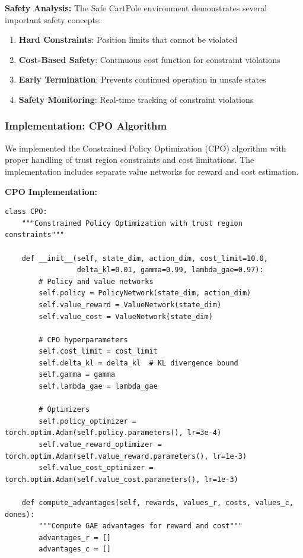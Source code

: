 \documentclass[12pt]{article}
\begin{document}
{{{{\textbf{Safety Analysis:}
The Safe CartPole environment demonstrates several important safety concepts:
\begin{enumerate}
\item \textbf{Hard Constraints}: Position limits that cannot be violated
\item \textbf{Cost-Based Safety}: Continuous cost function for constraint violations
\item \textbf{Early Termination}: Prevents continued operation in unsafe states
\item \textbf{Safety Monitoring}: Real-time tracking of constraint violations
\end{enumerate}

\subsubsection{Implementation: CPO Algorithm}

We implemented the Constrained Policy Optimization (CPO) algorithm with proper handling of trust region constraints and cost limitations. The implementation includes separate value networks for reward and cost estimation.

\textbf{CPO Implementation:}
\begin{verbatim}
class CPO:
    """Constrained Policy Optimization with trust region constraints"""
    
    def __init__(self, state_dim, action_dim, cost_limit=10.0, 
                 delta_kl=0.01, gamma=0.99, lambda_gae=0.97):
        # Policy and value networks
        self.policy = PolicyNetwork(state_dim, action_dim)
        self.value_reward = ValueNetwork(state_dim)
        self.value_cost = ValueNetwork(state_dim)
        
        # CPO hyperparameters
        self.cost_limit = cost_limit
        self.delta_kl = delta_kl  # KL divergence bound
        self.gamma = gamma
        self.lambda_gae = lambda_gae
        
        # Optimizers
        self.policy_optimizer = torch.optim.Adam(self.policy.parameters(), lr=3e-4)
        self.value_reward_optimizer = torch.optim.Adam(self.value_reward.parameters(), lr=1e-3)
        self.value_cost_optimizer = torch.optim.Adam(self.value_cost.parameters(), lr=1e-3)
    
    def compute_advantages(self, rewards, values_r, costs, values_c, dones):
        """Compute GAE advantages for reward and cost"""
        advantages_r = []
        advantages_c = []
        

\end{verbatim}}}}}
\end{document}
